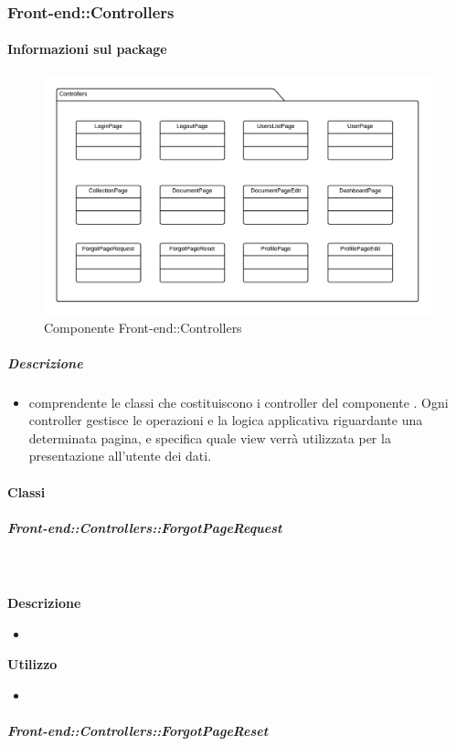   \subsubsection{Front-end::Controllers}
  \paragraph{Informazioni sul package}
    \begin{figure}[H] 
      \begin{center} 
        \includegraphics[width=\textwidth]{packages/Front-end::Controllers.png}  
        \caption{Componente Front-end::Controllers}
      \end{center}  
    \end{figure} 
  \subparagraph{Descrizione} 
    \begin{itemize}
    \item[]  comprendente le classi che costituiscono i controller del componente . Ogni controller gestisce le operazioni e la logica applicativa riguardante una determinata pagina, e specifica quale view verrà utilizzata per la presentazione all'utente dei dati.
    \end{itemize} 
    \paragraph{Classi}
      \subparagraph{Front-end::Controllers::ForgotPageRequest}
        
        \textbf{\\ \\ Descrizione} 
          \begin{itemize}
            \item[] 
          \end{itemize}      
        \textbf{Utilizzo}  
          \begin{itemize}
            \item[] 
          \end{itemize}
      \subparagraph{Front-end::Controllers::ForgotPageReset}
        
